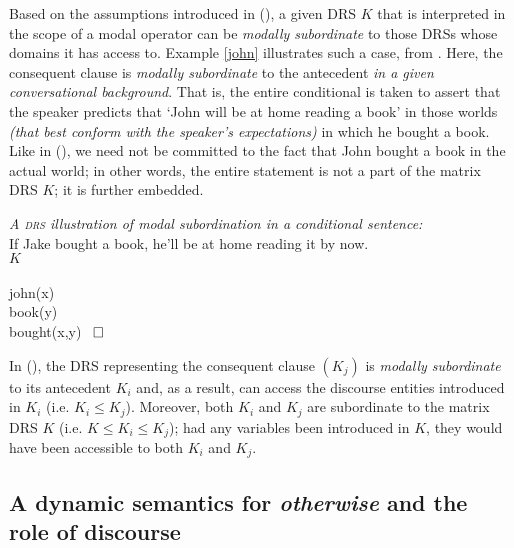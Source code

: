 Based on the assumptions introduced in (\lastx), a given DRS $ K $ that is interpreted in the scope of a modal operator can be \textit{modally subordinate} to those DRSs whose domains it has access to. Example \ref{john} illustrates such a case, from \citet[701]{Roberts1989} . Here, the consequent clause is \textit{modally subordinate} to the antecedent \textit{in a given conversational background}. That is, the entire conditional is taken to assert that the speaker predicts that `John will be at home reading a book' in those worlds \textit{(that best conform with the speaker's expectations)} in which he bought a book. Like in (\lastx), we need not be committed to the fact that John bought a book in the actual world; in other words, the entire statement is not a part of the matrix DRS $ K $; it is further embedded.


\pex{}  \textit{A \textsc{drs} illustration of modal subordination in a conditional sentence:} \\
If Jake bought a book, he'll be at home reading it by now.\\
\hspace*{.25\textwidth}$\scriptstyle K $\\
\drs{}
{\\		
	{
		john(x)\\
		book(y)\\
		bought(x,y)
	}
	~$ \boldsymbol{\LARGE\square} $		 
}\xe

\noindent In (), the DRS representing the consequent clause $ (K_j) $ is \textit{modally subordinate} to its antecedent $ K_i $ and, as a result, can access the discourse entities introduced in $ K_i $ (i.e. $ K_i\leqslant K_j $). Moreover, both $K_i$ and $K_j$ are subordinate to the matrix DRS $K$ (i.e. $ K\leqslant K_i\leqslant K_j $); had any variables been introduced in $K$, they would have been accessible to both $K_i$ and $K_j$. 


\subsection{A dynamic semantics for \textit{otherwise} and the role of discourse}
\label{sec:proposal}


